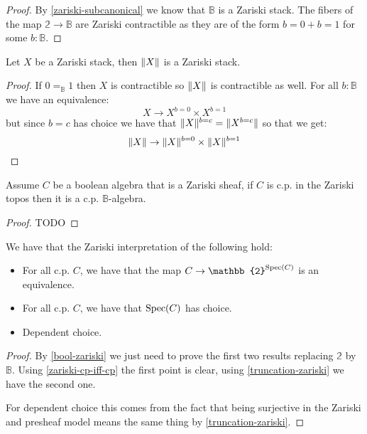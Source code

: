 \begin{proof}
By \cref{zariski-subcanonical} we know that $\mathbb{B}$ is a Zariski stack. The fibers of the map $\mathbb{2}\to\mathbb{B}$ are Zariski contractible as they are of the form $b=0+b=1$ for some $b:\mathbb{B}$.
\end{proof}

\begin{lemma}\label{truncation-zariski}
Let $X$ be a Zariski stack, then $\lVert X \rVert$ is a Zariski stack.
\end{lemma}

\begin{proof}
If $0=_\mathbb{B}1$ then $X$ is contractible so $\lVert X \rVert$ is contractible as well. For all $b:\mathbb{B}$ we have an equivalence:
\[X\to X^{b=0}\times X^{b=1}\]
but since $b=c$ has choice we have that $\lVert X \rVert^{b=c} = \lVert X^{b=c} \rVert$ so that we get:
\[\lVert X \rVert\to \lVert X \rVert^{b=0}\times \lVert X \rVert^{b=1}\]
\end{proof}

\begin{lemma}\label{zariski-cp-iff-cp}
Assume $C$ be a boolean algebra that is a Zariski sheaf, if $C$ is c.p. in the Zariski topos then it is a c.p. $\mathbb{B}$-algebra.
\end{lemma}

\begin{proof}
TODO
\end{proof}

\begin{theorem}
We have that the Zariski interpretation of the following hold:
\begin{itemize}
\item For all c.p. $C$, we have that the map $C\to \mathbb{2}^{\Sp(C)}$ is an equivalence.
\item For all c.p. $C$, we have that $\operatorname{Spec}(C)$ has choice.
\item Dependent choice.
\end{itemize}
\end{theorem}

\begin{proof}
By \cref{bool-zariski} we just need to prove the first two results replacing $\mathbb{2}$ by $\mathbb{B}$. Using \cref{zariski-cp-iff-cp} the first point is clear, using \cref{truncation-zariski} we have the second one.

For dependent choice this comes from the fact that being surjective in the Zariski and presheaf model means the same thing by \cref{truncation-zariski}.
\end{proof}


